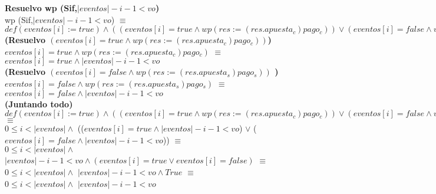 \documentclass[10pt,a4paper]{article}
\begin{document}
\begin{flushleft}
\begin{enumerate}
	\vspace{6mm}
	\textbf{Resuelvo wp (Sif,$|eventos|-i-1<vo$)}\\
	\vspace{2mm}
	wp (Sif,$|eventos|-i-1<vo$) $\equiv$ \\
	\vspace{2mm}
	$def (eventos[i]:=true) \wedge ((eventos[i]=true \wedge wp (res:=(res.apuesta_c)pago_c))\vee (eventos[i]=false \wedge wp (res:=(res.apuesta_s)pago_s)))$\\
	\vspace{2mm}
	\textbf{(Resuelvo $(eventos[i]=true \wedge wp (res:=(res.apuesta_c)pago_c))$)} \\
	\vspace{2mm}
	$eventos[i]=true \wedge wp (res:=(res.apuesta_c)pago_c) $ $\equiv$ \\
	\vspace{2mm}
	$eventos[i]=true \wedge  |eventos|-i-1<vo$ \\
	\vspace{2mm}
	\textbf{(Resuelvo $(eventos[i]=false \wedge wp (res:=(res.apuesta_s)pago_s))$ )} \\
	\vspace{2mm}
	$eventos[i]=false \wedge wp (res:=(res.apuesta_s)pago_s) $ $\equiv$ \\
	\vspace{2mm}
	$eventos[i]=false \wedge  |eventos|-i-1<vo$ \\
	\vspace{2mm}
	\textbf{(Juntando todo)} \\
	\vspace{2mm}
	$def (eventos[i]:=true) \wedge ((eventos[i]=true \wedge wp (res:=(res.apuesta_c)pago_c))\vee (eventos[i]=false \wedge wp (res:=(res.apuesta_s)pago_s)))$ $\equiv$ \\
	\vspace{2mm}
	$0 \leq i <|eventos| \wedge$ (($eventos[i]=true \wedge  |eventos|-i-1<vo$) $\vee$  ($eventos[i]=false \wedge  |eventos|-i-1<vo$)) $\equiv$\\
	\vspace{2mm}
	$0 \leq i <|eventos| \wedge$ $|eventos|-i-1<vo \wedge (eventos[i]=true \vee eventos[i]=false)$ $\equiv$ \\
	\vspace{2mm}
	$0 \leq i <|eventos| \wedge$ $|eventos|-i-1<vo \wedge True$ $\equiv$ \\
	\vspace{2mm}
	$0 \leq i <|eventos| \wedge$ $|eventos|-i-1<vo$ \\

\end{enumerate}
\end{flushleft}
\end{document}
